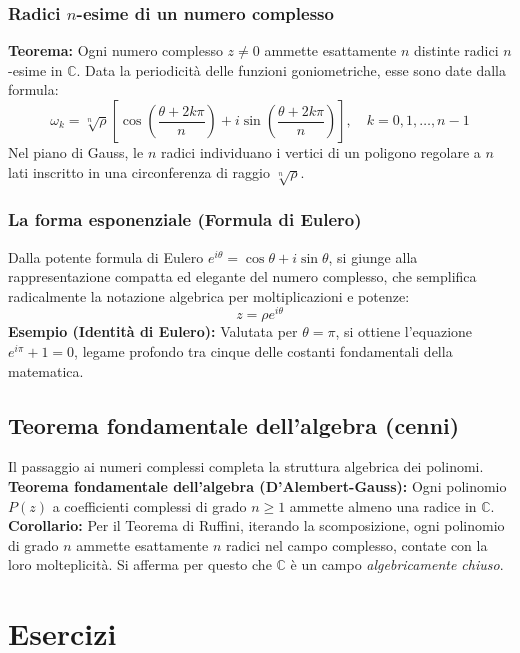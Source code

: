 \subsubsection{Radici $n$-esime di un numero complesso}
\textbf{Teorema:} Ogni numero complesso $z \neq 0$ ammette esattamente $n$ distinte radici $n$-esime in $\mathbb{C}$. Data la periodicità delle funzioni goniometriche, esse sono date dalla formula:
\[ \omega_k = \sqrt[n]{\rho} \left[ \cos\left(\frac{\theta + 2k\pi}{n}\right) + i\sin\left(\frac{\theta + 2k\pi}{n}\right) \right], \quad k = 0, 1, \dots, n-1 \]
Nel piano di Gauss, le $n$ radici individuano i vertici di un poligono regolare a $n$ lati inscritto in una circonferenza di raggio $\sqrt[n]{\rho}$.

\subsubsection{La forma esponenziale (Formula di Eulero)}
Dalla potente formula di Eulero $e^{i\theta} = \cos \theta + i \sin \theta$, si giunge alla rappresentazione compatta ed elegante del numero complesso, che semplifica radicalmente la notazione algebrica per moltiplicazioni e potenze:
\[ z = \rho e^{i\theta} \]
\textbf{Esempio (Identità di Eulero):} Valutata per $\theta = \pi$, si ottiene l'equazione $e^{i\pi} + 1 = 0$, legame profondo tra cinque delle costanti fondamentali della matematica.

\subsection{Teorema fondamentale dell'algebra (cenni)}
Il passaggio ai numeri complessi completa la struttura algebrica dei polinomi.
\textbf{Teorema fondamentale dell'algebra (D'Alembert-Gauss):} Ogni polinomio $P(z)$ a coefficienti complessi di grado $n \ge 1$ ammette almeno una radice in $\mathbb{C}$. 
\textbf{Corollario:} Per il Teorema di Ruffini, iterando la scomposizione, ogni polinomio di grado $n$ ammette esattamente $n$ radici nel campo complesso, contate con la loro molteplicità. Si afferma per questo che $\mathbb{C}$ è un campo \textit{algebricamente chiuso}.

\section{Esercizi}

